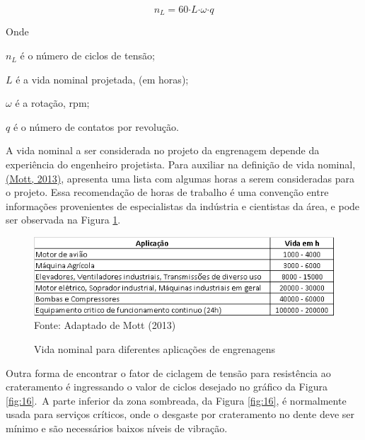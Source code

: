 \documentclass[12pt,a4paper]{article}
\begin{document}
\begin{equation}
\label{eq20}
n_L\mathrm{=60}\mathrm{\cdot }L\mathrm{\cdot }\omega \mathrm{\cdot }q
\end{equation}

Onde

\(n_{L}\) é o número de ciclos de tensão;

\(L\) é a vida nominal projetada, (em horas);

\(\omega\) é a rotação, rpm;

\(q\) é o número de contatos por revolução.

A vida nominal a ser considerada no projeto da engrenagem depende da
experiência do engenheiro projetista. Para auxiliar na definição de vida
nominal, \hyperref[csl:21]{(Mott, 2013)}, apresenta uma lista com algumas horas a
serem consideradas para o projeto. Essa recomendação de horas de
trabalho é uma convenção entre informações provenientes de especialistas
da indústria e cientistas da área, e pode ser observada na Figura
{\ref{fig:15}}.

\begin{figure}[!htb]
    \centering
    \caption{Vida nominal para diferentes aplicações de engrenagens}
    \includegraphics[scale=0.99]{Imagens/Img15.png}\\
    {\footnotesize Fonte: Adaptado de Mott (2013)}
    \label{fig:15}
\end{figure}


Outra forma de encontrar o fator de ciclagem de tensão para resistência
ao crateramento é ingressando o valor de ciclos desejado no gráfico da
Figura {\ref{fig:16}}.~A parte inferior da zona
sombreada, da Figura {\ref{fig:16}}, é normalmente
usada para serviços críticos, onde o desgaste por crateramento no dente
deve ser mínimo e são necessários baixos níveis de vibração.
\end{document}
